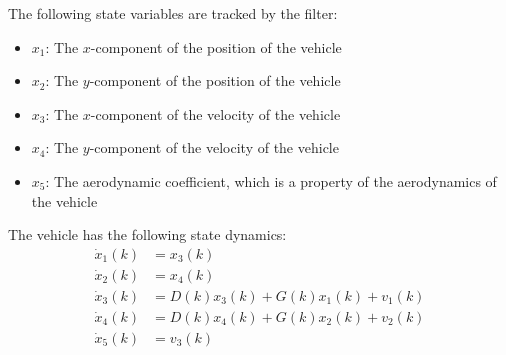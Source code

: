 \documentclass[]{article}
\begin{document}
The following state variables are tracked by the filter:
\begin{itemize}
    \item $x_{1}$: The $x$-component of the position of the vehicle
    \item $x_{2}$: The $y$-component of the position of the vehicle
    \item $x_{3}$: The $x$-component of the velocity of the vehicle
    \item $x_{4}$: The $y$-component of the velocity of the vehicle
    \item $x_{5}$: The aerodynamic coefficient, which is a property of the aerodynamics of the vehicle
\end{itemize}

The vehicle has the following state dynamics:
\begin{equation}
\begin{split}
    \dot{x}_{1}(k) & = x_{3}(k) \\
    \dot{x}_{2}(k) & = x_{4}(k) \\
    \dot{x}_{3}(k) & = D(k) x_{3}(k) + G(k) x_{1}(k) + v_{1}(k) \\
    \dot{x}_{4}(k) & = D(k) x_{4}(k) + G(k) x_{2}(k) + v_{2}(k) \\
    \dot{x}_{5}(k) & = v_{3}(k) \\
\end{split}
\label{equ:dynamics}
\end{equation}
\end{document}
